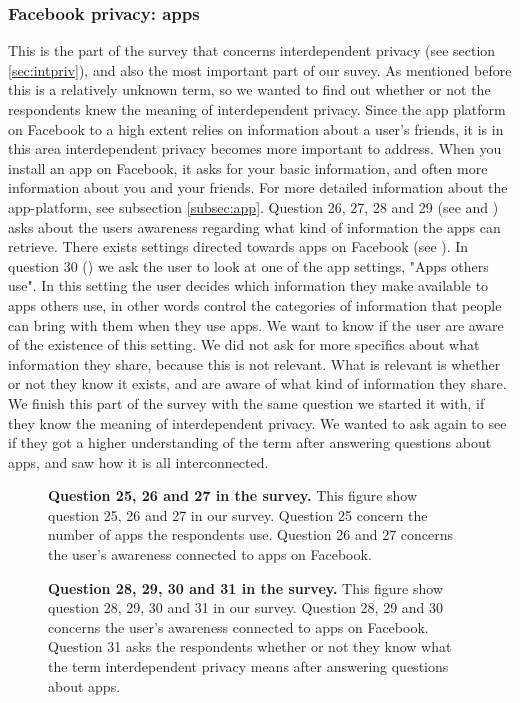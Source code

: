 \subsubsection{Facebook privacy: apps}
This is the part of the survey that concerns interdependent privacy (see section \ref{sec:intpriv}), and also the most important part of our suvey. As mentioned before this is a relatively unknown term, so we wanted to find out whether or not the respondents knew the meaning of interdependent privacy. Since the app platform on Facebook to a high extent relies on information about a user's friends, it is in this area interdependent privacy becomes more important to address. When you install an app on Facebook, it asks for your basic information, and often more information about you and your friends. For more detailed information about the app-platform, see subsection \ref{subsec:app}. Question 26, 27, 28 and 29 (see  and ) asks about the users awareness regarding what kind of information the apps can retrieve. There exists settings directed towards apps on Facebook (see ). In question 30 () we ask the user to look at one of the app settings, "Apps others use". In this setting the user decides which information they make available to apps others use, in other words control the categories of information that people can bring with them when they use apps. We want to know if the user are aware of the existence of this setting. We did not ask for more specifics about what information they share, because this is not relevant. What is relevant is whether or not they know it exists, and are aware of what kind of information they share. We finish this part of the survey with the same question we started it with, if they know the meaning of interdependent privacy. We wanted to ask again to see if they got a higher understanding of the term after answering questions about apps, and saw how it is all interconnected. 

\begin{figure}[h!]
\centering
{}
\caption[Question 25, 26 and 27 in the survey]{\textbf{Question 25, 26 and 27 in the survey.} This figure show question 25, 26 and 27 in our survey. Question 25 concern the number of apps the respondents use. Question 26 and 27 concerns the user's awareness connected to apps on Facebook.} 
\label{fig:page14}
\end{figure}

\begin{figure}[h!]
\centering
{}
\caption[Question 28, 29, 30 and 31 in the survey]{\textbf{Question 28, 29, 30 and 31 in the survey.} This figure show question 28, 29, 30 and 31 in our survey. Question 28, 29 and 30 concerns the user's awareness connected to apps on Facebook. Question 31 asks the respondents whether or not they know what the term interdependent privacy means after answering questions about apps.} 
\label{fig:page15}
\end{figure}


